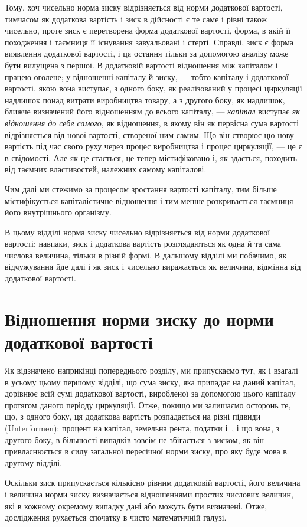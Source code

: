 Тому, хоч чисельно норма зиску відрізняється від норми додаткової
вартості, тимчасом як додаткова вартість і зиск в
дійсності є те саме і рівні також чисельно, проте зиск є перетворена
форма додаткової вартості, форма, в якій її походження
і таємниця її існування завуальовані і стерті. Справді,
зиск є форма виявлення додаткової вартості, і ця остання тільки
за допомогою аналізу може бути вилущена з першої. В додатковій
вартості відношення між капіталом і працею оголене; у
відношенні капіталу й зиску, — тобто капіталу і додаткової вартості,
якою вона виступає, з одного боку, як реалізований у
процесі циркуляції надлишок понад витрати виробництва товару,
а з другого боку, як надлишок, ближче визначений його
відношенням до всього капіталу, — \emph{капітал} виступає \emph{як відношення
до себе самого}, як відношення, в якому він як первісна
сума вартості відрізняється від нової вартості, створеної ним
самим. Що він створює цю нову вартість під час свого
руху через процес виробництва і процес циркуляції, — це є в свідомості.
Але як це стається, це тепер містифіковано і, як
здається, походить від таємних властивостей, належних самому
капіталові.

Чим далі ми стежимо за процесом зростання вартості капіталу,
тим більше містифікується капіталістичне відношення і тим
менше розкривається таємниця його внутрішнього організму.

В цьому відділі норма зиску чисельно відрізняється від
норми додаткової вартості; навпаки, зиск і додаткова вартість
розглядаються як одна й та сама числова величина, тільки
в різній формі. В дальшому відділі ми побачимо, як відчужування
йде далі і як зиск і чисельно виражається як величина,
відмінна від додаткової вартості.

\section{Відношення норми зиску до норми
додаткової вартості}

Як відзначено наприкінці попереднього розділу, ми припускаємо
тут, як і взагалі в усьому цьому першому відділі, що
сума зиску, яка припадає на даний капітал, дорівнює всій сумі
додаткової вартості, виробленої за допомогою цього капіталу
протягом даного періоду циркуляції. Отже, покищо ми залишаємо
осторонь те, що, з одного боку, ця додаткова вартість
розпадається на різні підвиди (Unterformen): процент на капітал,
земельна рента, податки і~, і що вона, з другого боку,
в більшості випадків зовсім не збігається з зиском, як він привласнюється
в силу загальної пересічної норми зиску, про яку
буде мова в другому відділі.

Оскільки зиск припускається кількісно рівним додатковій
вартості, його величина і величина норми зиску визначається відношеннями
простих числових величин, які в кожному окремому
випадку дані або можуть бути визначені. Отже, дослідження
рухається спочатку в чисто математичній галузі.
